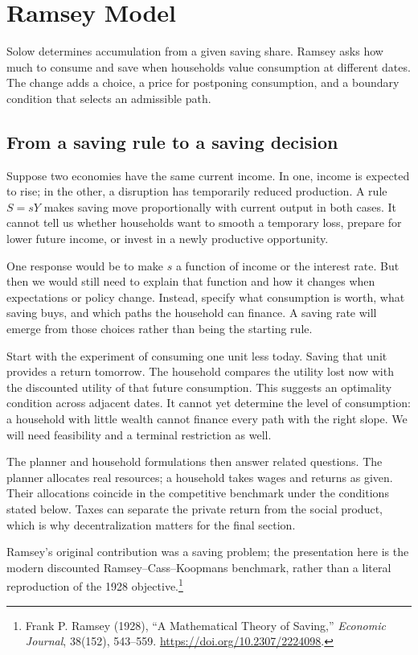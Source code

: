 \section{Ramsey Model}\label{sec:ramsey}

Solow determines accumulation from a given saving share. Ramsey asks how much
to consume and save when households value consumption at different dates.
The change adds a choice, a price for postponing consumption, and a boundary
condition that selects an admissible path.

\subsection{From a saving rule to a saving decision}

Suppose two economies have the same current income. In one, income is expected
to rise; in the other, a disruption has temporarily reduced production. A rule
$S=sY$ makes saving move proportionally with current output in both cases.
It cannot tell us whether households want to smooth a temporary loss, prepare
for lower future income, or invest in a newly productive opportunity.

One response would be to make $s$ a function of income or the interest rate.
But then we would still need to explain that function and how it changes when
expectations or policy change. Instead, specify what consumption is worth,
what saving buys, and which paths the household can finance. A saving rate
will emerge from those choices rather than being the starting rule.

Start with the experiment of consuming one unit less today. Saving that unit
provides a return tomorrow. The household compares the utility lost now with
the discounted utility of that future consumption. This suggests an optimality
condition across adjacent dates. It cannot yet determine the level of
consumption: a household with little wealth cannot finance every path with
the right slope. We will need feasibility and a terminal restriction as well.

The planner and household formulations then answer related questions. The
planner allocates real resources; a household takes wages and returns as given.
Their allocations coincide in the competitive benchmark under the conditions
stated below. Taxes can separate the private return from the social product,
which is why decentralization matters for the final section.

Ramsey's original contribution was a saving problem; the presentation here is
the modern discounted Ramsey--Cass--Koopmans benchmark, rather than a literal
reproduction of the 1928 objective.\footnote{Frank P. Ramsey (1928), ``A
Mathematical Theory of Saving,'' \textit{Economic Journal}, 38(152), 543--559.
\url{https://doi.org/10.2307/2224098}.}

